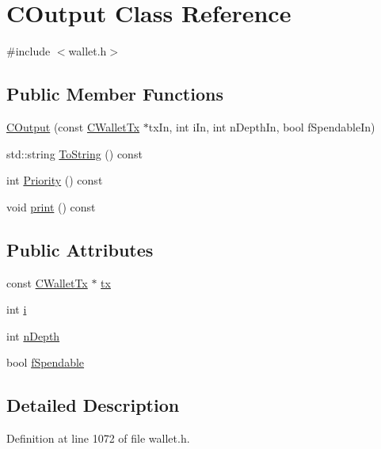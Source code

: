 \hypertarget{class_c_output}{}\section{C\+Output Class Reference}
\label{class_c_output}


{\ttfamily \#include $<$wallet.\+h$>$}

\subsection*{Public Member Functions}
\begin{DoxyCompactItemize}
\item 
\hyperlink{class_c_output_aeabdb54cd3dbac8e985cae6aa976c575}{C\+Output} (const \hyperlink{class_c_wallet_tx}{C\+Wallet\+Tx} $\ast$tx\+In, int i\+In, int n\+Depth\+In, bool f\+Spendable\+In)
\item 
std\+::string \hyperlink{class_c_output_a30a78d31f6667803c613efdef28cbe52}{To\+String} () const 
\item 
int \hyperlink{class_c_output_a7b967787d636440d6b67930a436d5c8f}{Priority} () const 
\item 
void \hyperlink{class_c_output_af9f37df9eace0c8a58b8029a2c59366f}{print} () const 
\end{DoxyCompactItemize}
\subsection*{Public Attributes}
\begin{DoxyCompactItemize}
\item 
const \hyperlink{class_c_wallet_tx}{C\+Wallet\+Tx} $\ast$ \hyperlink{class_c_output_ad5c15e7a2dc48258127b8fd5db421ad5}{tx}
\item 
int \hyperlink{class_c_output_ae1b3534a41afb09bb04a499017f2821e}{i}
\item 
int \hyperlink{class_c_output_a2eb24fc73c35fcc551b736d68bd1c64a}{n\+Depth}
\item 
bool \hyperlink{class_c_output_ab8fa647313fbc2cda12f8b064031dd11}{f\+Spendable}
\end{DoxyCompactItemize}


\subsection{Detailed Description}


Definition at line 1072 of file wallet.\+h.



